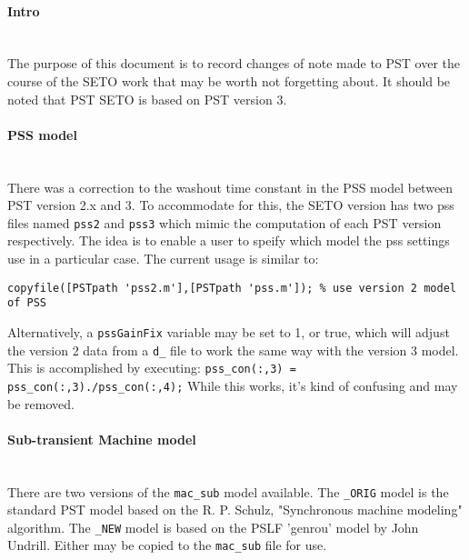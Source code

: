 \documentclass[12pt]{article}
\begin{document}
\onehalfspacing
\paragraph{Intro} \ \\
The purpose of this document is to record changes of note made to PST over the course of the SETO work that may be worth not forgetting about.
It should be noted that PST SETO is based on PST version 3.

\paragraph{PSS model} \ \\
There was a correction to the washout time constant in the PSS model between PST version 2.x and 3.
To accommodate for this, the SETO version has two pss files named \verb|pss2| and \verb|pss3| which mimic the computation of each PST version respectively.
The idea is to enable a user to speify which model the pss settings use in a particular case.
The current usage is similar to:
\begin{verbatim}
copyfile([PSTpath 'pss2.m'],[PSTpath 'pss.m']); % use version 2 model of PSS
\end{verbatim}

Alternatively, a \verb|pssGainFix| variable may be set to 1, or true, which will adjust the version 2 data from a \verb|d_| file to work the same way with the version 3 model.
This is accomplished by executing: \verb|pss_con(:,3) = pss_con(:,3)./pss_con(:,4);|
While this works, it's kind of confusing and may be removed.

\paragraph{Sub-transient Machine model} \ \\
There are two versions of the \verb|mac_sub| model available.
The \verb|_ORIG| model is the standard PST model based on the R. P. Schulz, "Synchronous machine modeling" algorithm.
The \verb|_NEW| model is based on the PSLF 'genrou' model by John Undrill.
Either may be copied to the \verb|mac_sub| file for use.

\end{document}

